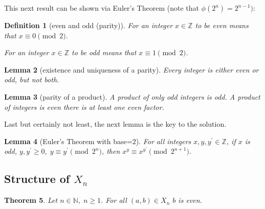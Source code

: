 \documentclass[1gpt]{article}
\theoremstyle{break}
\newtheorem{theorem}{Theorem}[section]
\newtheorem{lemma}[theorem]{Lemma}
\newtheorem{definition}[theorem]{Definition}
\begin{document}
This next result can be shown via Euler's Theorem (note that $\phi(2^n) =
2^{n-1})$:

\begin{definition}[even and odd (parity)]
    \label{def:parity}
    For an integer $x \in \mathbb{Z}$ to be even means that $x \equiv 0
    \pmod{2}$.

    For an integer $x \in \mathbb{Z}$ to be odd means that $x \equiv 1
    \pmod{2}$.
\end{definition}

\begin{lemma}[existence and uniqueness of a parity]
    \label{lem:parity}
    Every integer is either even or odd, but not both.
\end{lemma}

\begin{lemma}[parity of a product]
    \label{lem:product-parity}
    A product of only odd integers is odd. A product of integers is even there
    is at least one even factor.
\end{lemma}

Last but certainly not least, the next lemma is the key to the solution.

\begin{lemma}[Euler's Theorem with base=$2$]
    \label{lem:euler}
    For all integers $x, y, y^\prime \in \mathbb{Z}$, if $x$ is odd, $y,
    y^\prime \geq 0, \; y \equiv y^\prime \pmod{2^n}$, then $x^{y} \equiv
    x^{y^\prime} \pmod{2^{n+1}}$.
\end{lemma}

\subsection{Structure of \texorpdfstring{$X_n$}{Xn}}

\begin{theorem}
    \label{thm:b-even}
    Let $n \in \mathbb{N},\; n \geq 1$. For all $(a, b) \in X_n$ $b$ is even.
\end{theorem}
\end{document}
